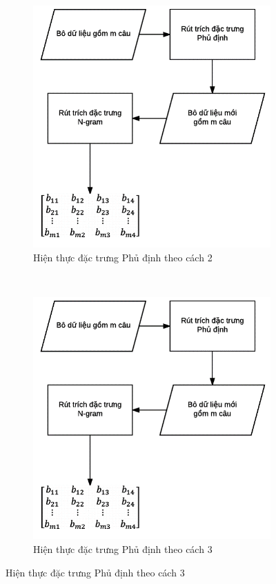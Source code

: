 \begin{figure}
\begin{subfigure}{0.3\textwidth}
\includegraphics[scale=0.3]{../hinh/hien_thuc_negation.png}
\caption{Hiện thực đặc trưng Phủ định theo cách 2} \label{fig:hien-thuc-negation-2}
\end{subfigure}
~
\begin{subfigure}{0.3\textwidth}
\centering
\includegraphics[scale=0.3]{../hinh/hien_thuc_negation.png}
\caption{Hiện thực đặc trưng Phủ định theo cách 3} \label{fig:hien-thuc-negation-3}
\end{subfigure}
\end{figure}


